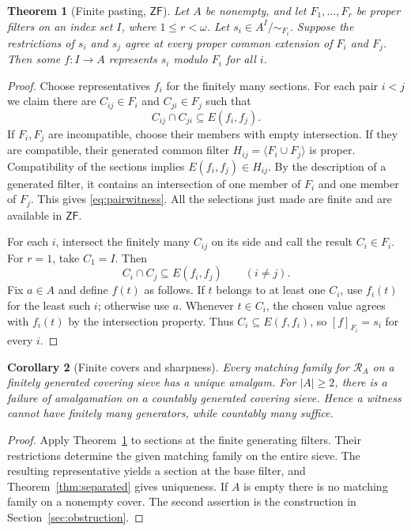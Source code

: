 \documentclass[11pt,letterpaper]{article}
\newtheorem{theorem}{Theorem}[section]
\newtheorem{corollary}[theorem]{Corollary}
\theoremstyle{definition}
\theoremstyle{remark}
\newcommand{\om}{\omega}
\newcommand{\RA}{\mathscr R_A}
\newcommand{\gen}[1]{\langle #1\rangle}
\newcommand{\ZF}{\mathsf{ZF}}
\begin{document}
\begin{theorem}[Finite pasting, $\ZF$]\label{thm:finite}
Let $A$ be nonempty, and let $F_1,\ldots,F_r$ be proper filters on an
index set $I$, where $1\leq r<\om$. Let $s_i\in A^I/{\sim_{F_i}}$.
Suppose the restrictions of $s_i$ and $s_j$ agree at every proper common
extension of $F_i$ and $F_j$. Then some $f:I\to A$ represents $s_i$
modulo $F_i$ for all $i$.
\end{theorem}
\begin{proof}
Choose representatives $f_i$ for the finitely many sections. For each
pair $i<j$ we claim there are $C_{ij}\in F_i$ and $C_{ji}\in F_j$
such that
\begin{equation}\label{eq:pairwitness}
 C_{ij}\cap C_{ji}\subseteq E(f_i,f_j).
\end{equation}
If $F_i,F_j$ are incompatible, choose their members with empty
intersection. If they are compatible, their generated common filter
$H_{ij}=\gen{F_i\cup F_j}$ is proper. Compatibility of the sections
implies $E(f_i,f_j)\in H_{ij}$. By the description of a generated
filter, it contains an intersection of one member of $F_i$ and one
member of $F_j$. This gives \eqref{eq:pairwitness}. All the selections
just made are finite and are available in $\ZF$.

For each $i$, intersect the finitely many $C_{ij}$ on its side and call
the result $C_i\in F_i$. For $r=1$, take $C_1=I$. Then
\[
 C_i\cap C_j\subseteq E(f_i,f_j)\qquad(i\neq j).
\]
Fix $a\in A$ and define $f(t)$ as follows. If $t$ belongs to at least
one $C_i$, use $f_i(t)$ for the least such $i$; otherwise use $a$.
Whenever $t\in C_i$, the chosen value agrees with $f_i(t)$ by the
intersection property. Thus $C_i\subseteq E(f,f_i)$, so
$[f]_{F_i}=s_i$ for every $i$.
\end{proof}

\begin{corollary}[Finite covers and sharpness]\label{cor:sharp}
Every matching family for $\RA$ on a finitely generated covering sieve
has a unique amalgam. For $|A|\geq2$, there is a failure of amalgamation
on a countably generated covering sieve. Hence a witness cannot have
finitely many generators, while countably many suffice.
\end{corollary}
\begin{proof}
Apply Theorem~\ref{thm:finite} to sections at the finite generating
filters. Their restrictions determine the given matching family on the
entire sieve. The resulting representative yields a section at the base
filter, and Theorem~\ref{thm:separated} gives uniqueness. If $A$ is
empty there is no matching family on a nonempty cover. The second
assertion is the construction in Section~\ref{sec:obstruction}.
\end{proof}
\end{document}
